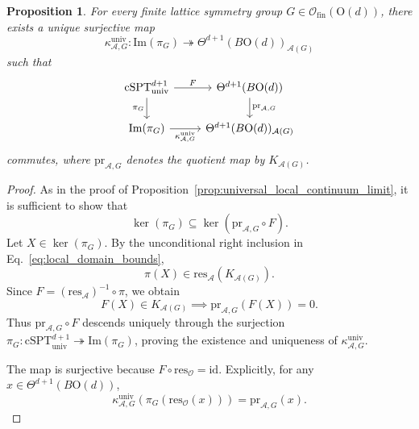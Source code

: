 \documentclass[aps,prx,reprint,superscriptaddress,twocolumn,amsmath,amssymb,amsfonts, nofootinbib]{revtex4-2}
\newcommand{\csptu}{\mathrm{cSPT}^{d+1}_{\mathrm{univ}}}
\newcommand{\ofin}{\mathcal{O}_{\text{fin}}}
\newcommand{\res}{\text{res}}
\theoremstyle{apsstyle}
\newtheorem{proposition}[theorem]{Proposition}
\begin{document}
\begin{proposition}
\label{prop:elementary_visible_local_limit}
For every finite lattice symmetry group
$G\in\ofin(\mathrm{O}(d))$, there exists a unique surjective map
\begin{equation}
    \kappa^{\mathrm{univ}}_{\mathcal A,G}:
    \mathrm{Im}(\pi_G)
    \twoheadrightarrow
    \Theta^{d+1}(B\mathrm{O}(d))_{\mathcal A(G)}
    \label{eq:elementary_visible_local_limit}
\end{equation}
such that
\begin{equation}
\begin{tikzcd}
    \csptu
    \arrow[r, "F"]
    \arrow[d, "\pi_G"']
    &
    \Theta^{d+1}(B\mathrm{O}(d))
    \arrow[d, "\mathrm{pr}_{\mathcal A,G}"]
    \\
    \mathrm{Im}(\pi_G)
    \arrow[r, "\kappa^{\mathrm{univ}}_{\mathcal A,G}"']
    &
    \Theta^{d+1}(B\mathrm{O}(d))_{\mathcal A(G)}
\end{tikzcd}
\label{eq:elementary_visible_local_diagram}
\end{equation}
commutes, where $\mathrm{pr}_{\mathcal A,G}$ denotes the quotient map by
$K_{\mathcal A(G)}$.
\end{proposition}

\begin{proof}
As in the proof of Proposition~\ref{prop:universal_local_continuum_limit}, it is sufficient to show that
\begin{equation*}
    \ker(\pi_G)
    \subseteq
    \ker(\mathrm{pr}_{\mathcal A,G}\circ F).
\end{equation*}
Let $X\in\ker(\pi_G)$. By the unconditional right inclusion in
Eq.~\ref{eq:local_domain_bounds},
\begin{equation*}
    \pi(X)
    \in
    \res_{\mathcal A}(K_{\mathcal A(G)}).
\end{equation*}
Since $F=(\res_{\mathcal A})^{-1}\circ\pi$,
we obtain
\begin{equation*}
    F(X)\in K_{\mathcal A(G)}\implies 
    \mathrm{pr}_{\mathcal A,G}(F(X))=0.
\end{equation*}
Thus $\mathrm{pr}_{\mathcal A,G}\circ F$ descends uniquely through the surjection
$\pi_G:\csptu\twoheadrightarrow\mathrm{Im}(\pi_G)$, proving the existence and uniqueness of
$\kappa^{\mathrm{univ}}_{\mathcal A,G}$.

\noindent The map is surjective because
$F\circ\res_{\mathcal O}=\mathrm{id}$. Explicitly, for any
$x\in\Theta^{d+1}(B\mathrm{O}(d))$,
\begin{equation*}
    \kappa^{\mathrm{univ}}_{\mathcal A,G}
    \left(
        \pi_G(\res_{\mathcal O}(x))
    \right)
    =
    \mathrm{pr}_{\mathcal A,G}(x).
\end{equation*}
\end{proof}
\end{document}
